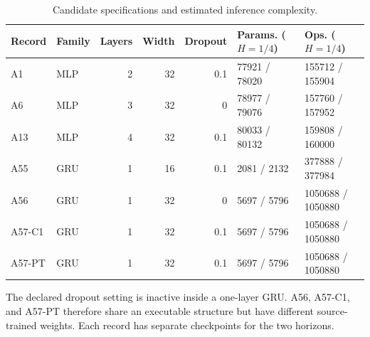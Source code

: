 \begin{table}[!htbp]
\centering\footnotesize
\caption{Candidate specifications and estimated inference complexity.}\label{tab:s-bank}
\begin{tabular}{llrrrll}
\toprule
Record & Family & Layers & Width & Dropout & Params. ($H=1/4$) & Ops. ($H=1/4$)\\\midrule
A1 & MLP & 2 & 32 & 0.1 & 77921 / 78020 & 155712 / 155904\\
A6 & MLP & 3 & 32 & 0 & 78977 / 79076 & 157760 / 157952\\
A13 & MLP & 4 & 32 & 0.1 & 80033 / 80132 & 159808 / 160000\\
A55 & GRU & 1 & 16 & 0.1 & 2081 / 2132 & 377888 / 377984\\
A56 & GRU & 1 & 32 & 0 & 5697 / 5796 & 1050688 / 1050880\\
A57-C1 & GRU & 1 & 32 & 0.1 & 5697 / 5796 & 1050688 / 1050880\\
A57-PT & GRU & 1 & 32 & 0.1 & 5697 / 5796 & 1050688 / 1050880\\
\bottomrule\end{tabular}
\par\vspace{3pt}\begin{minipage}{\linewidth}\footnotesize The declared dropout setting is inactive inside a one-layer GRU. A56, A57-C1, and A57-PT therefore share an executable structure but have different source-trained weights. Each record has separate checkpoints for the two horizons.\end{minipage}
\end{table}
